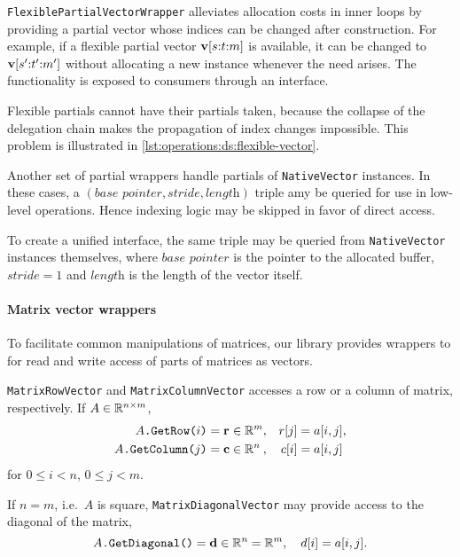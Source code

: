 \texttt{FlexiblePartialVectorWrapper} alleviates allocation costs in
inner loops by providing a partial vector whose indices can be changed
after construction. For example, if a flexible partial vector
$\bm{\mathrm{v}}[s{:}t{:}m]$ is available, it can be changed to
$\bm{\mathrm{v}}[s'{:}t'{:}m']$ without allocating a new instance
whenever the need arises. The functionality is exposed to consumers
through an interface.

Flexible partials cannot have their partials taken, because the
collapse of the delegation chain makes the propagation of index
changes impossible. This problem is illustrated in
\cref{lst:operations:ds:flexible-vector}.

Another set of partial wrappers handle partials of
\texttt{NativeVector} instances. In these cases, a
$(\textit{base pointer}, \textit{stride}, \textit{length})$ triple amy
be queried for use in low-level operations. Hence indexing logic may
be skipped in favor of direct access.

To create a unified interface, the same triple may be queried from
\texttt{NativeVector} instances themselves, where $\textit{base
  pointer}$ is the pointer to the allocated buffer, $\textit{stride} =
1$ and $\textit{length}$ is the length of the vector itself.

\paragraph{Matrix vector wrappers}

To facilitate common manipulations of matrices, our library provides
wrappers to for read and write access of parts of matrices as
vectors.

\texttt{MatrixRowVector} and \texttt{MatrixColumnVector} accesses a
row or a column of matrix, respectively. If $A \in \mathbb{R}^{n \times m}$,
\begin{align}
  \texttt{$A$.GetRow($i$)} = \mathrlap{\vec{r}}\phantom{\vec{c}} \in \RR^m, \quad
  &r[j] = a[i, j] \text,\\
  \texttt{$A$.GetColumn($j$)} = \vec{c} \in \RR^{\mathrlap{n}\phantom{m}}, \quad
  &\phantom{r[j]}\mathllap{c[i]} = a[i, j]
\end{align}
for $0 \le i < n$, $0 \le j < m$.

If $n = m$, i.e.~$A$ is square, \texttt{MatrixDiagonalVector} may
provide access to the diagonal of the matrix,
\begin{equation}
  \texttt{$A$.GetDiagonal()} = \bm{\mathrm{d}} \in \mathbb{R}^n = \mathbb{R}^m, \quad
  d[i] = a[i, j] \text.
\end{equation}


